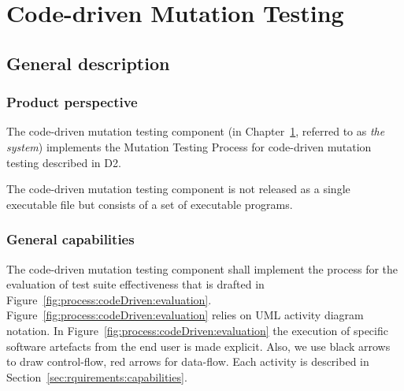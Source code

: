 

\chapter{Code-driven Mutation Testing}
\label{chapter:codeDriven}

\section{General description}


\subsection{Product perspective}

\RQ{} The code-driven mutation testing component (in Chapter~\ref{chapter:codeDriven}, referred to as \emph{the system}) implements the Mutation Testing Process for code-driven mutation testing described in D2.

\RQ{} The code-driven mutation testing component is not released as a single executable file but consists of a set of executable programs.

\clearpage
\subsection{General capabilities}

\RQ{} The code-driven mutation testing component shall implement the process for the evaluation of test suite effectiveness that is drafted in Figure~\ref{fig:process:codeDriven:evaluation}. Figure~\ref{fig:process:codeDriven:evaluation} relies on UML activity diagram notation. In Figure~\ref{fig:process:codeDriven:evaluation} the execution of specific software artefacts from the end user is made explicit. Also, we use black arrows to draw control-flow, red arrows for data-flow. Each activity is described in Section~\ref{sec:rquirements:capabilities}.

